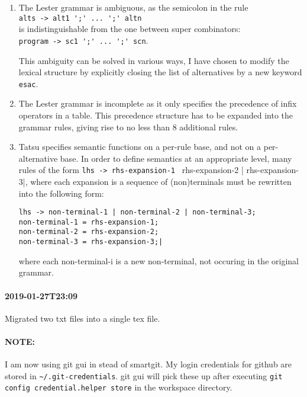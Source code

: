 \documentclass[11pt, a4paper]{article}
\begin{document}
\begin{enumerate}

\item The Lester grammar is ambiguous, as the semicolon in the rule \\
\verb|alts -> alt1 ';' ... ';' altn| \\
is indistinguishable from the one between super combinators:\\
\verb|program -> sc1 ';' ... ';' scn|.

This ambiguity can be solved in various ways, I have chosen to modify the lexical structure by explicitly closing the list of alternatives by a new keyword \verb+esac+.

\item The Lester grammar is incomplete as it only specifies the precedence of infix operators in a table. This precedence structure has to be expanded into the grammar rules, giving rise to no less than 8 additional rules.

\item Tatsu specifies semantic functions on a per-rule base, and not on a per-alternative base. In order to define semantics at an appropriate level, many rules of the form
\verb|lhs -> rhs-expansion-1 | rhs-expansion-2 | rhs-expansion-3|, 
where each expansion is a sequence of (non)terminals must be rewritten into the following form:

\begin{Verbatim}
lhs -> non-terminal-1 | non-terminal-2 | non-terminal-3;
non-terminal-1 = rhs-expansion-1;
non-terminal-2 = rhs-expansion-2;
non-terminal-3 = rhs-expansion-3;|
\end{Verbatim}
where each non-terminal-i is a new non-terminal, not occuring in the original grammar.
\end{enumerate}

\paragraph{2019-01-27T23:09}
Migrated two txt files into a single tex file.

\paragraph{NOTE:}
I am now using git gui in stead of smartgit.
My login credentials for github are stored in \verb|~/.git-credentials|.
git gui will pick these up after executing \verb|git config credential.helper store| in the workspace directory.
\end{document}
